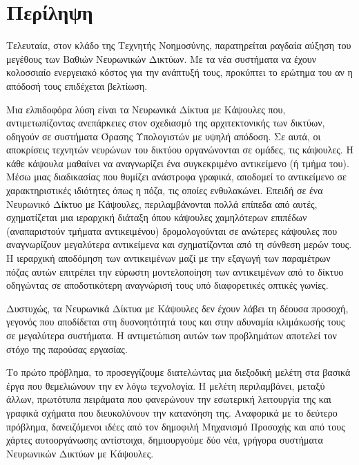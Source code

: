 \chapter*{Περίληψη}



Τελευταία, στον κλάδο της Τεχνητής Νοημοσύνης, παρατηρείται ραγδαία αύξηση του μεγέθους των Βαθιών Νευρωνικών Δικτύων. Με τα νέα συστήματα να έχουν κολοσσιαίο ενεργειακό κόστος για την ανάπτυξή τους, προκύπτει το ερώτημα του αν η απόδοσή τους επιδέχεται βελτίωση.\par

Μια ελπιδοφόρα λύση είναι τα Νευρωνικά Δίκτυα με Κάψουλες που, αντιμετωπίζοντας ανεπάρκειες στον σχεδιασμό της αρχιτεκτονικής των δικτύων, οδηγούν σε συστήματα Όρασης Υπολογιστών με υψηλή απόδοση. Σε αυτά, οι αποκρίσεις τεχνητών νευρώνων του δικτύου οργανώνονται σε ομάδες, τις κάψουλες. Η κάθε κάψουλα μαθαίνει να αναγνωρίζει ένα συγκεκριμένο αντικείμενο (ή τμήμα του). Μέσω μιας διαδικασίας που θυμίζει ανάστροφα γραφικά, αποδομεί το αντικείμενο σε χαρακτηριστικές ιδιότητες όπως η πόζα, τις οποίες ενθυλακώνει. Επειδή σε ένα Νευρωνικό Δίκτυο με Κάψουλες, περιλαμβάνονται πολλά επίπεδα από αυτές, σχηματίζεται μια ιεραρχική διάταξη όπου κάψουλες χαμηλότερων επιπέδων (αναπαριστούν τμήματα αντικειμένου) δρομολογούνται σε ανώτερες κάψουλες που αναγνωρίζουν μεγαλύτερα αντικείμενα και σχηματίζονται από τη σύνθεση μερών τους. Η ιεραρχική αποδόμηση των αντικειμένων μαζί με την εξαγωγή των παραμέτρων πόζας αυτών επιτρέπει την εύρωστη μοντελοποίηση των αντικειμένων από το δίκτυο οδηγώντας σε αποδοτικότερη αναγνώρισή τους υπό διαφορετικές οπτικές γωνίες.\par

Δυστυχώς, τα Νευρωνικά Δίκτυα με Κάψουλες δεν έχουν λάβει τη δέουσα προσοχή, γεγονός που αποδίδεται στη δυσνοητότητά τους και στην αδυναμία κλιμάκωσής τους σε μεγαλύτερα συστήματα. Η αντιμετώπιση αυτών των προβλημάτων αποτελεί τον στόχο της παρούσας εργασίας.\par

Το πρώτο πρόβλημα, το προσεγγίζουμε διατελώντας μια διεξοδική μελέτη στα βασικά έργα που θεμελιώνουν την εν λόγω τεχνολογία. Η μελέτη περιλαμβάνει, μεταξύ άλλων, πρωτότυπα πειράματα που φανερώνουν την εσωτερική λειτουργία της και γραφικά σχήματα που διευκολύνουν την κατανόηση της. Αναφορικά με το δεύτερο πρόβλημα, δανειζόμενοι ιδέες από τον δημοφιλή Μηχανισμό Προσοχής και από τους χάρτες αυτο\textendash οργάνωσης αντίστοιχα, δημιουργούμε δύο νέα, γρήγορα συστήματα Νευρωνικών Δικτύων με Κάψουλες.\par

